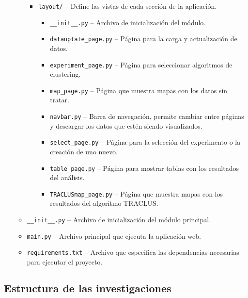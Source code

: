 \begin{itemize}
\begin{itemize}
\begin{itemize}
\begin{itemize}
            	\end{itemize}
			\item \texttt{layout/} -- Define las vistas de cada sección de la aplicación.
			\begin{itemize}
            		\item \texttt{\_\_init\_\_.py} -- Archivo de inicialización del módulo.
           		\item \texttt{datauptate\_page.py} -- Página para la carga y actualización de datos.
            		\item \texttt{experiment\_page.py} -- Página para seleccionar algoritmos de clustering.
            		\item \texttt{map\_page.py} -- Página que muestra mapas con los datos sin tratar.
            		\item \texttt{navbar.py} -- Barra de navegación, permite cambiar entre páginas y descargar los datos que estén siendo visualizados.
            		\item \texttt{select\_page.py} -- Página para la selección del experimento o la creación de uno nuevo.
            		\item \texttt{table\_page.py} -- Página para mostrar tablas con los resultados del análisis.
				\item \texttt{TRACLUSmap\_page.py} -- Página que muestra mapas con los resultados del algoritmo TRACLUS.
			\end{itemize}
		\end{itemize}
		\item \texttt{\_\_init\_\_.py} -- Archivo de inicialización del módulo principal.
		\item \texttt{main.py} -- Archivo principal que ejecuta la aplicación web.
		\item \texttt{requirements.txt} -- Archivo que especifica las dependencias necesarias para ejecutar el proyecto.
    \end{itemize}
\end{itemize}

\subsection*{Estructura de las investigaciones}

